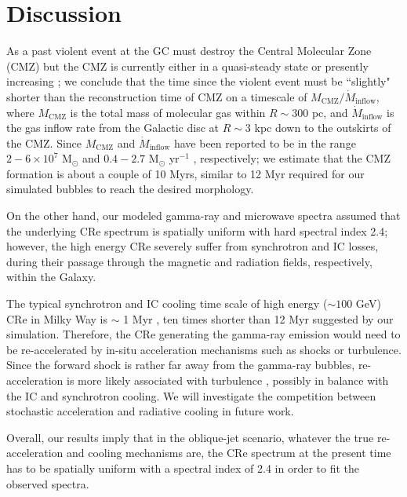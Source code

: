 \chapter{Discussion}
\label{c:discussion}

As a past violent event at the GC must destroy the Central Molecular Zone (CMZ)
but the CMZ is currently either in a quasi-steady state or
presently increasing \citep{Crocker2012,Krumholz2015,Sormani2019};
we conclude that the time since the violent event must be ``slightly" shorter
than the reconstruction time of CMZ on a timescale of
$M_{\text{CMZ}}/\dot{M}_{\text{inflow}}$, where $M_{\text{CMZ}}$ is
the total mass of molecular gas within $R\sim300$ pc,
and $\dot{M}_{\text{inflow}}$ is the gas inflow rate from the Galactic disc at
$R\sim3$ kpc down to the outskirts of the CMZ.
Since $M_{\text{CMZ}}$ and $\dot{M}_{\text{inflow}}$ have been reported to be in the range
$2-6\times10^{7}$ M$_{\odot}$ \citep{Dahmen1998,Ferrire2007} and
$0.4-2.7$ M$_{\odot}$ yr$^{-1}$ \citep{Crocker2012,Sormani2019}, respectively;
we estimate that the CMZ formation is about a couple of 10 Myrs, similar to
12 Myr required for our simulated bubbles to reach the desired morphology.

On the other hand, our modeled gamma-ray and microwave spectra assumed that
the underlying CRe spectrum is spatially uniform with hard spectral index 2.4;
however, the high energy CRe severely suffer from synchrotron and IC losses,
during their passage through the magnetic and radiation fields, respectively, within the Galaxy.

The typical synchrotron and IC cooling time scale of high energy ($\sim100$ GeV) CRe
in Milky Way is $\sim$ 1 Myr \citep{Yang2017}, ten times shorter than
12 Myr suggested by our simulation.
Therefore, the CRe generating the gamma-ray emission would need to be re-accelerated
by in-situ acceleration mechanisms such as shocks or turbulence.
Since the forward shock is rather far away from the gamma-ray bubbles,
re-acceleration is more likely associated with turbulence \citep{Mertsch2011,Mertsch2019},
possibly in balance with the IC and synchrotron cooling. We will investigate the
competition between stochastic acceleration and radiative cooling in future work.

Overall, our results imply that in the oblique-jet scenario,
whatever the true re-acceleration and cooling mechanisms are,
the CRe spectrum at the present time has to be spatially uniform with
a spectral index of 2.4 in order to fit the observed spectra.






